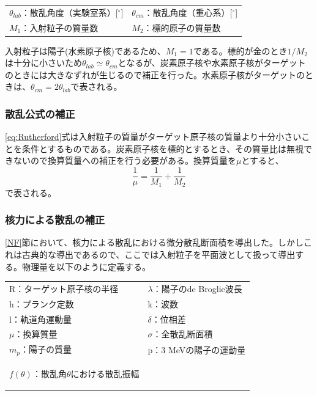 \documentclass[a4paper,11pt,dvipdfmx]{jsarticle}
\begin{document}
\begin{table}[h]
\small
\centering
\begin{tabular}{ll} 
    $\theta_{lab}$：散乱角度（実験室系）[$^\circ$] & $\theta_{cm}$：散乱角度（重心系）[$^\circ$] \\
    $M_1$：入射粒子の質量数 & $M_2$：標的原子の質量数
    \label{def2}
\end{tabular}
\end{table}

\noindent
入射粒子は陽子(水素原子核)であるため、$M_1 = 1$である。標的が金のとき$1/M_2$は十分に小さいため$\theta_{lab} \simeq \theta_{cm}$となるが、炭素原子核や水素原子核がターゲットのときには大きなずれが生じるので補正を行った。水素原子核がターゲットのときは、$\theta_{cm} = 2      \theta_{lab}$で表される。

\subsubsection{散乱公式の補正}\label{kakuhosei}
\eqref{eq:Rutherford}式は入射粒子の質量がターゲット原子核の質量より十分小さいことを条件とするものである。炭素原子核を標的とするとき、その質量比は無視できないので換算質量への補正を行う必要がある。換算質量を$\mu$とすると、
\begin{equation}
\frac{1}{\mu} = \frac{1}{M_1} + \frac{1}{M_2}
\end{equation}
で表される。

\newpage
\subsubsection{核力による散乱の補正}
\ref{NF}節において、核力による散乱における微分散乱断面積を導出した。しかしこれは古典的な導出であるので、ここでは入射粒子を平面波として扱って導出する。物理量を以下のように定義する。
\begin{table}[h]
\small
\it
\centering
\begin{tabular}{ll} 
    R：ターゲット原子核の半径 & $\lambda$：陽子の{\rm de Broglie}波長\\
    h：プランク定数 & k：波数\\
    l：軌道角運動量 & $\delta$：位相差\\
    $\mu$：換算質量 & $\sigma$：全散乱断面積\\
    $m_{p}$：陽子の質量 & p：{\rm3 MeV}の陽子の運動量\\
    $f(\theta)$：散乱角$\theta$における散乱振幅
    
\label{def3}
\end{tabular}
\end{table}
\end{document}
